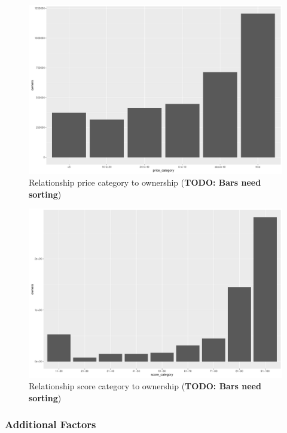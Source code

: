 \begin{figure}[!t]
	\centering
	\includegraphics[width=1.0\columnwidth]{images/rel-price-category-owners.pdf}
	\caption{Relationship price category to ownership (\textbf{TODO: Bars need sorting})}
\label{fig:rel-price-category-owners}
\end{figure}

\begin{figure}[!t]
	\centering
	\includegraphics[width=1.0\columnwidth]{images/rel-score-category-owners.pdf}
	\caption{Relationship score category to ownership (\textbf{TODO: Bars need sorting})}
\label{fig:rel-score-category-owners}
\end{figure}



\subsubsection{Additional Factors}

